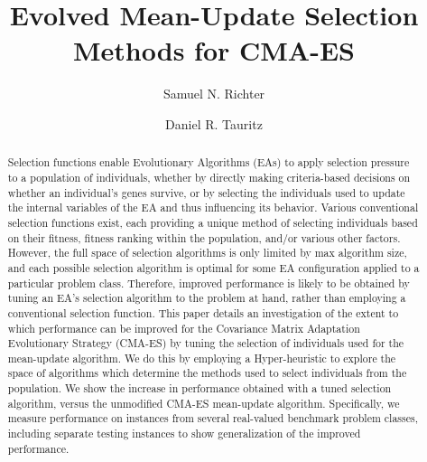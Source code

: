 \documentclass[sigconf]{acmart}
\begin{document}
\title[Evolved Mean-Update Selection Methods for CMA-ES]{Evolved Mean-Update Selection Methods for CMA-ES}

\author{Samuel N. Richter}

\author{Daniel R. Tauritz}


\begin{abstract}
Selection functions enable Evolutionary Algorithms (EAs) to apply selection pressure to a population of individuals, whether by directly making criteria-based decisions on whether an individual's genes survive, or by selecting the individuals used to update the internal variables of the EA and thus influencing its behavior. Various conventional selection functions exist, each providing a unique method of selecting individuals based on their fitness, fitness ranking within the population, and/or various other factors. However, the full space of selection algorithms is only limited by max algorithm size, and each possible selection algorithm is optimal for some EA configuration applied to a particular problem class. Therefore, improved performance is likely to be obtained by tuning an EA's selection algorithm to the problem at hand, rather than employing a conventional selection function. This paper details an investigation of the extent to which performance can be improved for the Covariance Matrix Adaptation Evolutionary Strategy (CMA-ES) by tuning the selection of individuals used for the mean-update algorithm. We do this by employing a Hyper-heuristic to explore the space of algorithms which determine the methods used to select individuals from the population. We show the increase in performance obtained with a tuned selection algorithm, versus the unmodified CMA-ES mean-update algorithm. Specifically, we measure performance on instances from several real-valued benchmark problem classes, including separate testing instances to show generalization of the improved performance.

\end{abstract}

%
%
\end{document}
